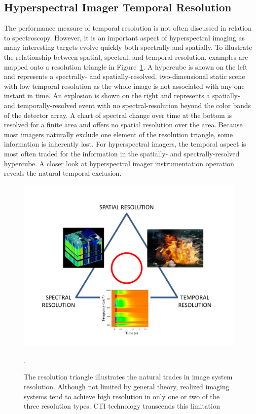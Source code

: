 \subsection{Hyperspectral Imager Temporal Resolution}
\label{sec:HSIres}
The performance measure of temporal resolution is not often discussed in relation to spectroscopy. However, it is an important aspect of hyperspectral imaging as many interesting targets evolve quickly both spectrally and spatially. To illustrate the relationship between spatial, spectral, and temporal resolution, examples are mapped onto a resolution triangle in Figure~\ref{fig:trifecta}. A hypercube is shown on the left and represents a spectrally- and spatially-resolved, two-dimensional static scene with low temporal resolution as the whole image is not associated with any one instant in time. An explosion is shown on the right and represents a spatially- and temporally-resolved event with no spectral-resolution beyond the color bands of the detector array. A chart of spectral change over time at the bottom is resolved for a finite area and offers no spatial resolution over the area. Because most imagers naturally exclude one element of the resolution triangle, some information is inherently lost. For hyperspectral imagers, the temporal aspect is most often traded for the information in the spatially- and spectrally-resolved hypercube. A closer look at hyperspectral imager instrumentation operation reveals the natural temporal exclusion.

\begin{figure}[htb]		%
\centering
\includegraphics[width=1\textwidth,page=1]{images/chap1/MyGraphics_Ch1}
\caption{The resolution triangle illustrates the natural trades in image system resolution. Although not limited by general theory, realized imaging systems tend to achieve high resolution in only one or two of the three resolution types. CTI technology transcends this limitation~\cite{Niederhauser,DarkKnight}}.
\label{fig:trifecta}
\end{figure}

